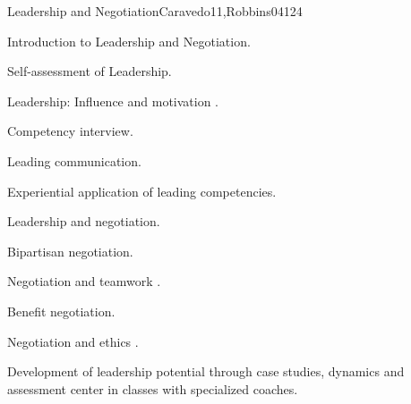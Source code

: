 \begin{syllabus}
\begin{unit}{Leadership and Negotiation}{}{Caravedo11,Robbins04}{12}{4}
   \begin{topics}
      \item Introduction to Leadership and Negotiation.
      \item Self-assessment of Leadership.
      \item Leadership: Influence and motivation .  
      \item Competency interview.
      \item Leading communication.   
      \item Experiential application of leading competencies.
      \item Leadership and negotiation.
      \item Bipartisan negotiation.
      \item Negotiation and teamwork .
      \item Benefit negotiation.
      \item Negotiation and ethics .  
 
      
   \end{topics}
   \begin{learningoutcomes}
      \item Development of leadership potential through case studies, dynamics and assessment center in classes with specialized coaches.
   \end{learningoutcomes}
\end{unit}


\begin{coursebibliography}
\end{coursebibliography}

\end{syllabus}
